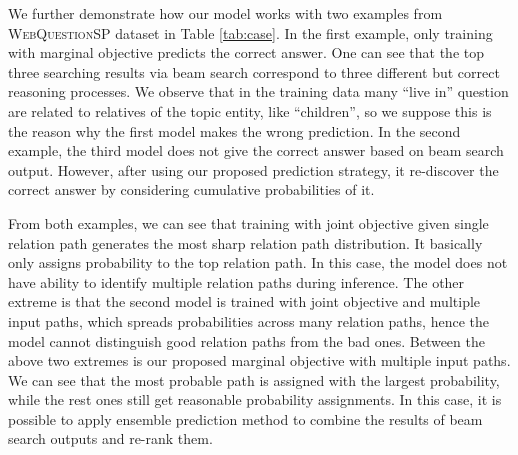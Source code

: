 
We further demonstrate how our model works with two examples from \textsc{WebQuestionSP} dataset in Table \ref{tab:case}. In the first example, only training with marginal objective predicts the correct answer. One can see that the top three searching results via beam search correspond to three different but correct reasoning processes. We observe that in the training data many ``live in'' question are related to relatives of the topic entity, like ``children'', so we suppose this is the reason why the first model makes the wrong prediction. In the second example, the third model does not give the correct answer based on beam search output. However, after using our proposed prediction strategy, it re-discover the correct answer by considering cumulative probabilities of it.

From both examples, we can see that training with joint objective given single relation path generates the most sharp relation path distribution. It basically only assigns probability to the top relation path. In this case, the model does not have ability to identify multiple relation paths during inference. The other extreme is that the second model is trained with joint objective and multiple input paths, which spreads probabilities across many relation paths, hence the model cannot distinguish good relation paths from the bad ones. Between the above two extremes is our proposed marginal objective with multiple input paths. We can see that the most probable path is assigned with the largest probability, while the rest ones still get reasonable probability assignments. In this case, it is possible to apply ensemble prediction method to combine the results of beam search outputs and re-rank them. %


